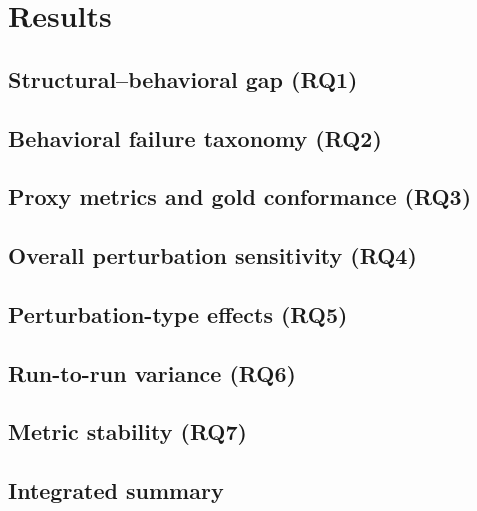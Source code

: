 \section{Results}
\label{sec:results}


\subsection{Structural--behavioral gap (RQ1)}
\label{sec:results:gap}

\subsection{Behavioral failure taxonomy (RQ2)}
\label{sec:results:failures}

\subsection{Proxy metrics and gold conformance (RQ3)}
\label{sec:results:proxies}

\subsection{Overall perturbation sensitivity (RQ4)}
\label{sec:results:perturbation-overall}

\subsection{Perturbation-type effects (RQ5)}
\label{sec:results:perturbation-types}

\subsection{Run-to-run variance (RQ6)}
\label{sec:results:variance}

\subsection{Metric stability (RQ7)}
\label{sec:results:stability}

\subsection{Integrated summary}
\label{sec:results:summary}

